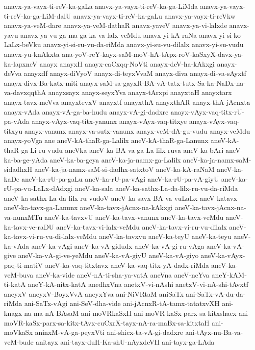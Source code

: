{anavx-ya-vayx-ti-reV-ka-gaLa
anavx-ya-vayx-ti-reV-ka-ga-LiMda
anavx-ya-vayx-ti-reV-ka-ga-LiM-dalU
anavx-ya-vayx-ti-reV-ka-gaLu
anavx-ya-vayx-ti-reVkw
anavx-ya-veM-dare
anavx-ya-veM-dathaR
anavx-yaveV
anavx-ya-vi-lalxde
anavx-yavu
anavx-ya-vu-ga-ma-ga-ka-va-lalx-veMdu
anavx-yi-kA-raNa
anavx-yi-si-ko-LaLx-beVku
anavx-yi-si-ru-vu-da-riMda
anavx-yi-su-vu-dilalx
anavx-yi-su-vudu
anavx-yu-knAkxta
ana-yoV-reY-kayx-saM-moV-hA-tApx-roV-kaSxyX-davx-ya-ka-lapxneV
anayx
anayxH
anayx-caCxqq-NoVti
anayx-deV-ha-kAkxgi
anayx-deVva
anayxdf
anayx-diVyoV
anayx-di-teyxVvaM
anayx-diva
anayx-di-va-sAyxtf
anayx-divx-Ba-katx-miti
anayx-saM-sa-gayxR-BA-vA-tatx-tutx-Sa-ka-NaDx-na-va-davxqqthA
anayxsayx
anayx-seyxYva
anayx-tArxpi
anayxtaH
anayxtarx
anayx-tavx-meVva
anayxtevxV
anayxtf
anayxthA
anayxthAR
anayx-thA-jAcnxta
anayx-vAda
anayx-vA-ga-ba-hudu
anayx-vA-gi-dadxre
anayx-vAyx-vaq-titx-rU-pa-vAda
anayx-vAyx-vaq-titx-yanunx
anayx-vAyx-vaq-titxye
anayx-vAyx-vaq-titxyu
anayx-vanunx
anayx-va-sutx-vanunx
anayx-veM-dA-gu-vudu
anayx-veMdu
anayx-yoVga
ane
aneV-kA-thaR-ga-Lalilx
aneV-kA-thaR-ga-Lanunx
aneV-kA-thaR-ga-Li-ru-vudu
aneVka
aneV-ka-BA-va-ga-La-lilx-ruva
aneV-ka-bAri
aneV-ka-ba-ge-yAda
aneV-ka-ba-geya
aneV-ka-ja-namx-ga-Lalilx
aneV-ka-ja-namx-saM-sidadhxH
aneV-ka-ja-namx-saM-si-dadhx-satxtoV
aneV-ka-kA-raNaM
aneV-ka-kaDe
aneV-ka-rU-pa-gaLu
aneV-ka-rU-pa-vAgi
aneV-ka-rU-pa-vA-giyU
aneV-ka-rU-pa-vu-LaLx-dAdxgi
aneV-ka-sala
aneV-ka-sathx-La-da-lilx-ru-vu-da-riMda
aneV-ka-sathx-La-da-lilx-ru-vudoV
aneV-ka-savx-BA-va-vuLaLx
aneV-katavx
aneV-ka-tavx-ga-Lanunx
aneV-ka-tavx-jAcnx-na-kAkxgi
aneV-ka-tavx-jAcnx-na-va-nunxMTu
aneV-ka-tavxvU
aneV-ka-tavx-vanunx
aneV-ka-tavx-veMdu
aneV-ka-tavx-ve-raDU
aneV-ka-tavx-vi-lalx-veMdu
aneV-ka-tavx-vi-ru-vu-dilalx
aneV-ka-tavx-vi-ru-vu-di-lalx-veMdu
aneV-ka-tavxvu
aneV-ka-teyU
aneV-ka-teyu
aneV-ka-vAda
aneV-ka-vAgi
aneV-ka-vA-gidudx
aneV-ka-vA-gi-ru-vAga
aneV-ka-vA-give
aneV-ka-vA-gi-ve-yeMdu
aneV-ka-vA-giyU
aneV-ka-vA-giyo
aneV-ka-vAyx-paq-ti-matiV
aneV-ka-vaq-titxtavx
aneV-ka-vaq-titx-yA-dadx-riMda
aneV-ka-veM-buva
aneV-ka-vide
aneV-nA-ti-sha-ya-vatA
aneVna
aneV-neYva
aneY-kAM-ti-katA
aneY-kA-nitx-katA
anedhxVna
anetxV-vi-nAshi
anetxV-vi-nA-shi-tAvxtf
aneyxV
aneyxV-BoyxVvA
aneyxYva
ani-NiVRtaM
aniSaTx
ani-SaTx-vA-du-da-riMda
ani-SaTx-vAgi
ani-SeV-dha-vide
ani-jAcnxR-tA-tamx-tatatxvXH
ani-knagx-na-ma-nA-BAsaM
ani-moVRkaSxH
ani-moVR-kaSx-parx-sa-kitxshacx
ani-moVR-kaSx-parx-sa-kitx-tAvx-cuCxrX-tayx-nA-ra-maBx-sa-kitxtaH
ani-moVkaSx
aninxM-vA-ga-peyxVti
ani-shicx-ta-vA-gi-dadxre
ani-tAyx-nu-Ba-va-veM-bude
anitayx
ani-tayx-duH-Ka-shU-nAyxdeVH
ani-tayx-ga-LAda
}
